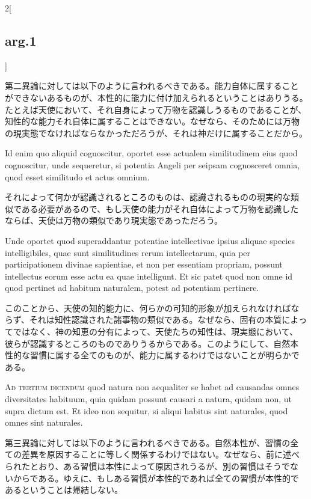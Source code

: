 \documentclass[paper=a4paper,fontsize=10pt,jafontsize=9pt,titlepage]{jlreq}
\begin{document}
\begin{paracol}{2}[\subsection{arg.1}]
\switchcolumn

第二異論に対しては以下のように言われるべきである。能力自体に属すること
ができないあるものが、本性的に能力に付け加えられるということはありうる。
たとえば天使において、それ自身によって万物を認識しうるものであることが、
知性的な能力それ自体に属することはできない。なぜなら、そのためには万物
の現実態でなければならなかっただろうが、それは神だけに属することだから。

\switchcolumn*

Id enim quo aliquid cognoscitur, oportet esse actualem similitudinem
eius quod cognoscitur, unde sequeretur, si potentia Angeli per seipsam
cognosceret omnia, quod esset similitudo et actus omnium.

\switchcolumn

それによって何かが認識されるところのものは、認識されるものの現実的な類
似である必要があるので、もし天使の能力がそれ自体によって万物を認識した
ならば、天使は万物の類似であり現実態であっただろう。

\switchcolumn*

Unde oportet quod superaddantur potentiae intellectivae ipsius aliquae
species intelligibiles, quae sunt similitudines rerum intellectarum,
quia per participationem divinae sapientiae, et non per essentiam
propriam, possunt intellectus eorum esse actu ea quae intelligunt. Et
sic patet quod non omne id quod pertinet ad habitum naturalem, potest
ad potentiam pertinere.

\switchcolumn

このことから、天使の知的能力に、何らかの可知的形象が加えられなければな
らず、それは知性認識された諸事物の類似である。なぜなら、固有の本質によっ
てではなく、神の知恵の分有によって、天使たちの知性は、現実態において、
彼らが認識するところのものでありうるからである。このようにして、自然本
性的な習慣に属する全てのものが、能力に属するわけではないことが明らかで
ある。

\switchcolumn*[\subsection{ad.3}]

{\scshape Ad tertium dicendum} quod natura non aequaliter se habet ad
causandas omnes diversitates habituum, quia quidam possunt causari a
natura, quidam non, ut supra dictum est. Et ideo non sequitur, si
aliqui habitus sint naturales, quod omnes sint naturales.

\switchcolumn

第三異論に対しては以下のように言われるべきである。自然本性が、習慣の全
ての差異を原因することに等しく関係するわけではない。なぜなら、前に述べ
られたとおり、ある習慣は本性によって原因されうるが、別の習慣はそうでな
いからである。ゆえに、もしある習慣が本性的であれば全ての習慣が本性的で
あるということは帰結しない。

\end{paracol}
\newpage
{}
{}
\setcounter{section}{2}
\setcounter{subsection}{0}
\end{document}
